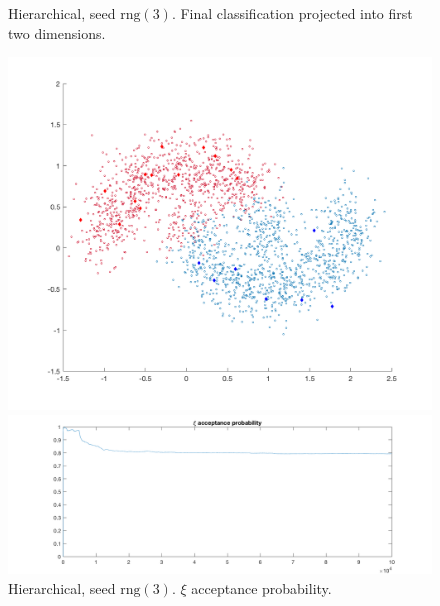 \documentclass{siamart1116}
\begin{document}
\begin{figure}[!htb]
\begin{minipage}{0.48\textwidth}
    \centering
    \caption{\label{fig:moons_hier1_scatter} Hierarchical, seed $\text{rng}(3)$. Final classification projected into first two dimensions.}
    \includegraphics[width=\linewidth]{moons/hier1/scatter.png}
\end{minipage} \hfill
\begin{minipage}{0.48\textwidth}
    \centering
    \caption{\label{fig:moons_hier1_u_accept} Hierarchical, seed $\text{rng}(3)$. $\xi$ acceptance probability.}
    \includegraphics[width=\linewidth]{moons/hier1/xi_accept.png}
\end{minipage}
\end{figure}
\end{document}
